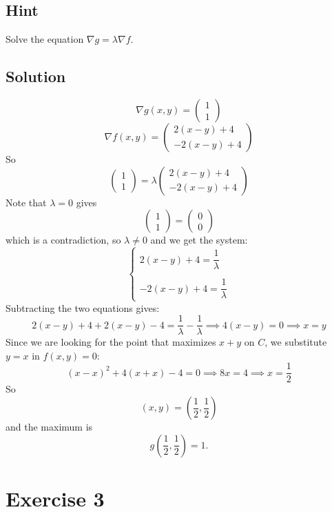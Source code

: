 \documentclass[a4paper,10pt]{article}
\begin{document}
\subsection{Hint}
Solve the equation $\nabla g = \lambda\nabla f$.

\subsection{Solution}
\[
    \nabla g(x,y) = \begin{pmatrix} 1 \\ 1 \end{pmatrix}
\]
\[
    \nabla f(x,y) = \begin{pmatrix} 2(x-y) + 4 \\ -2(x-y) + 4 \end{pmatrix}
\]
So
\[
    \begin{pmatrix} 1 \\ 1 \end{pmatrix} = \lambda \begin{pmatrix} 2(x-y) + 4 \\ -2(x-y) + 4 \end{pmatrix}
\]
Note that $\lambda = 0$ gives
\[
    \begin{pmatrix} 1 \\ 1 \end{pmatrix} = \begin{pmatrix} 0 \\ 0 \end{pmatrix}
\]
which is a contradiction, so $\lambda \neq 0$ and we get the system:
\[
    \begin{cases}
        2(x-y) + 4 = \dfrac{1}{\lambda} \\ \\
        -2(x-y) + 4 = \dfrac{1}{\lambda}
    \end{cases}
\]
Subtracting the two equations gives:
\[
    2(x-y) + 4 + 2(x-y) - 4 =  \frac{1}{\lambda} - \frac{1}{\lambda} \implies 4(x-y) = 0 \implies x = y
\]
Since we are looking for the point that maximizes $x+y$ on $C$, we substitute $y=x$ in $f(x,y)=0$:
\[
    (x-x)^2 + 4(x+x) - 4 = 0 \implies 8x = 4 \implies x = \frac{1}{2}
\]
So
\[
    (x, y) = \left(\frac{1}{2}, \frac{1}{2}\right)
\]
and the maximum is
\[
    g\left(\frac{1}{2}, \frac{1}{2}\right) = 1.
\]

\clearpage

\section{Exercise 3}
\end{document}
